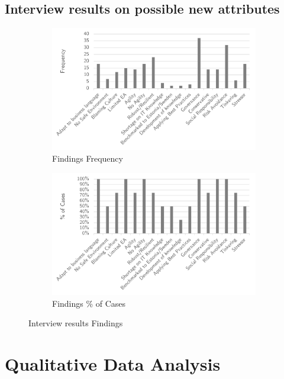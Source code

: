 \subsection{Interview results on possible new attributes}
\begin{figure}[H]
	\centering
	\begin{subfigure}[H]{0.5\textwidth}
		\centering
		\includegraphics[width=0.95\linewidth]{images/findings_frequency}
		\caption{Findings Frequency}
		\label{fig:findingsfrequency}
	\end{subfigure}%
	\begin{subfigure}[H]{0.5\textwidth}
		\centering
		\includegraphics[width=0.95\linewidth]{images/findings_cases}
		\caption{Findings \% of Cases}
		\label{fig:findingscases}
	\end{subfigure}
	\caption{Interview results Findings}
	\label{fig:interviewresultsfindings}
\end{figure}

\section{Qualitative Data Analysis}
\label{sec:dataprep}

